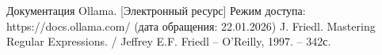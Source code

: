 \begin{thebibliography}{}
	 Документация Ollama. [Электронный ресурс] Режим доступа: https://docs.ollama.com/ (дата обращения: 22.01.2026)
	 J. Friedl. Mastering Regular Expressions. / Jeffrey E.F. Friedl -- O'Reilly, 1997. -- 342с.
\end{thebibliography}
